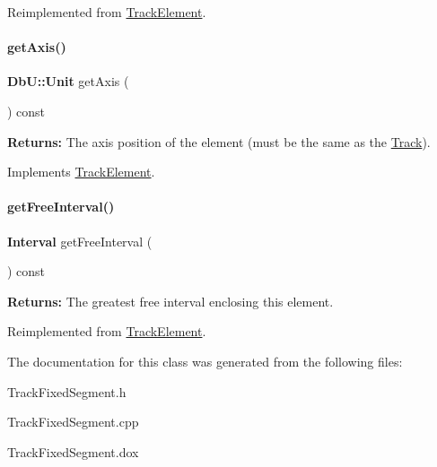 Reimplemented from \mbox{\hyperlink{classKite_1_1TrackElement_a55d6115d84c11ad147f4c38fe372ea24}{Track\+Element}}.

\mbox{\label{classKite_1_1TrackFixedSegment_ab5b5aaa5b318369feee6003dbad039c2}} 
\paragraph{\texorpdfstring{get\+Axis()}{getAxis()}}
{\footnotesize\ttfamily \textbf{ Db\+U\+::\+Unit} get\+Axis (\begin{DoxyParamCaption}{ }\end{DoxyParamCaption}) const\hspace{0.3cm}{\ttfamily [virtual]}}

{\bfseries Returns\+:} The axis position of the element (must be the same as the \mbox{\hyperlink{classKite_1_1Track}{Track}}). 

Implements \mbox{\hyperlink{classKite_1_1TrackElement_ac492fb5399691d81c31547db6b56fd03}{Track\+Element}}.

\mbox{\label{classKite_1_1TrackFixedSegment_a034711e2d3617ea848ef9f5a18255e10}} 
\paragraph{\texorpdfstring{get\+Free\+Interval()}{getFreeInterval()}}
{\footnotesize\ttfamily \textbf{ Interval} get\+Free\+Interval (\begin{DoxyParamCaption}{ }\end{DoxyParamCaption}) const\hspace{0.3cm}{\ttfamily [virtual]}}

{\bfseries Returns\+:} The greatest free interval enclosing this element. 

Reimplemented from \mbox{\hyperlink{classKite_1_1TrackElement_a034711e2d3617ea848ef9f5a18255e10}{Track\+Element}}.



The documentation for this class was generated from the following files\+:\begin{DoxyCompactItemize}
\item 
Track\+Fixed\+Segment.\+h\item 
Track\+Fixed\+Segment.\+cpp\item 
Track\+Fixed\+Segment.\+dox\end{DoxyCompactItemize}
